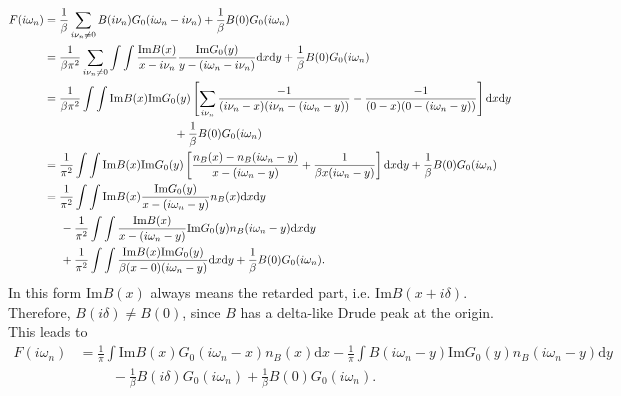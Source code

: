\documentclass[12pt,a4paper]{scrartcl}
\numberwithin{equation}{section}
\begin{document}
\begin{align}
 F(i\omega_n)  &= \frac{1}{\beta} \sum_{i\nu_n\neq 0} B(i\nu_n) G_0(i\omega_n - i\nu_n) 
                   + \frac{1}{\beta} B(0) G_0(i\omega_n) \\
&=\frac{1}{\beta\pi^2}\sum_{i\nu_n\neq 0} \int\int \frac{\mathrm{Im}B(x)}{x - i\nu_n} 
                                \frac{\mathrm{Im}G_0(y)}{y - (i\omega_n - i\nu_n)} \mathrm{d}x\mathrm{d}y+ \frac{1}{\beta} B(0) G_0(i\omega_n) \\
%                                
&=\frac{1}{\beta\pi^2} \int\int \mathrm{Im}B(x)\mathrm{Im}G_0(y) 
                            \left[\sum_{i\nu_n}\frac{-1}{ (i\nu_n -x)(i\nu_n - (i\omega_n - y))}
                                   - \frac{-1}{ (0 -x)(0 - (i\omega_n - y))} 
                            \right]\mathrm{d}x\mathrm{d}y \nonumber \\                                  
  & \hspace*{4cm}                          + \frac{1}{\beta} B(0) G_0(i\omega_n) \\
%
&=\frac{1}{\pi^2} \int\int \mathrm{Im}B(x)\mathrm{Im}G_0(y) 
                        \left[\frac{ n_B(x) - n_B(i\omega_n - y) }{x - (i\omega_n - y)}
                                   + \frac{1}{ \beta x(i\omega_n - y)} 
                            \right]\mathrm{d}x\mathrm{d}y + \frac{1}{\beta} B(0) G_0(i\omega_n) \\
%
&= \frac{1}{\pi^2} \int\int \mathrm{Im}B(x) \frac{\mathrm{Im}G_0(y)}{x - (i\omega_n - y)}n_B(x) \mathrm{d}x\mathrm{d}y \nonumber\\
& \hspace*{0.5cm} -\frac{1}{\pi^2} \int\int\frac{\mathrm{Im}B(x)}{x - (i\omega_n - y)} \mathrm{Im}G_0(y)n_B(i\omega_n - y) \mathrm{d}x\mathrm{d}y \nonumber\\
& \hspace*{0.5cm} +\frac{1}{\pi^2}\int\int \frac{\mathrm{Im}B(x)\mathrm{Im}G_0(y) }{\beta (x-0)(i\omega_n - y)}\mathrm{d}x\mathrm{d}y + \frac{1}{\beta} B(0) G_0(i\omega_n) .
%
\end{align}
In this form $\mathrm{Im}B(x)$ always means the retarded part, i.e. $\mathrm{Im}B(x+i\delta)$.
Therefore, $B(i\delta) \neq B(0)$, since $B$ has a delta-like Drude peak at the origin.
This leads to
\begin{align}
 F(i\omega_n)
 &=\frac{1}{\pi} \int \mathrm{Im}B(x) G_0(i\omega_n - x)n_B(x) \mathrm{d}x 
  -\frac{1}{\pi} \int B(i\omega_n-y) \mathrm{Im}G_0(y)n_B(i\omega_n-y) \mathrm{d}y \nonumber \\
& \hspace{1cm} - \frac{1}{\beta} B(i\delta)G_0(i\omega_n) +  \frac{1}{\beta} B(0) G_0(i\omega_n).
\end{align}
\end{document}
